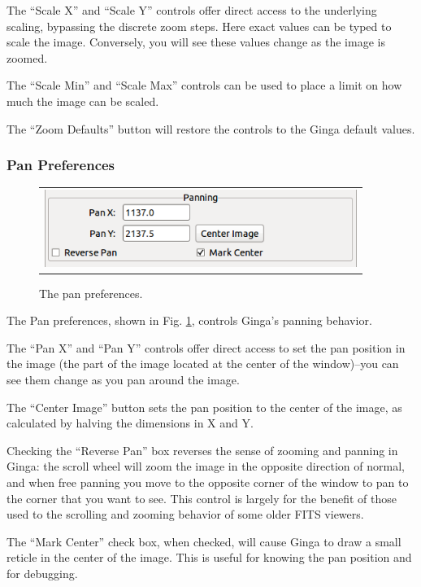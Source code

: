 \documentclass[11pt]{report}
\begin{document}
The ``Scale X'' and ``Scale Y'' controls offer direct access to the
underlying scaling, bypassing the discrete zoom steps.  Here exact
values can be typed to scale the image.  Conversely, you will see these
values change as the image is zoomed.

The ``Scale Min'' and ``Scale Max'' controls can be used to place a
limit on how much the image can be scaled.

The ``Zoom Defaults'' button will restore the controls to the Ginga
default values. 

\subsubsection{Pan Preferences}
\begin{figure}
  \begin{center}
    \begin{tabular}{c}
      \includegraphics[width=4in]{pan-prefs.png}
    \end{tabular}
  \end{center}
  \caption[example] 
          { \label{fig:prefs-pan} 
            The pan preferences.} 
\end{figure} 
The Pan preferences, shown in Fig. \ref{fig:prefs-pan}, controls
Ginga's panning behavior.

The ``Pan X'' and ``Pan Y'' controls offer direct access to set the pan
position in the image (the part of the image located at the center of
the window)--you can see them change as you pan around the image.

The ``Center Image'' button sets the pan position to the center of the
image, as calculated by halving the dimensions in X and Y.

Checking the ``Reverse Pan'' box reverses the sense of zooming and
panning in Ginga: the scroll wheel will zoom the image in the opposite
direction of normal, and when free panning you move to the opposite
corner of the window to pan to the corner that you want to see.  
This control is largely for the benefit of those used to the scrolling
and zooming behavior of some older FITS viewers.

The ``Mark Center'' check box, when checked, will cause Ginga to draw a
small reticle in the center of the image.  This is useful for knowing
the pan position and for debugging.
\end{document}
